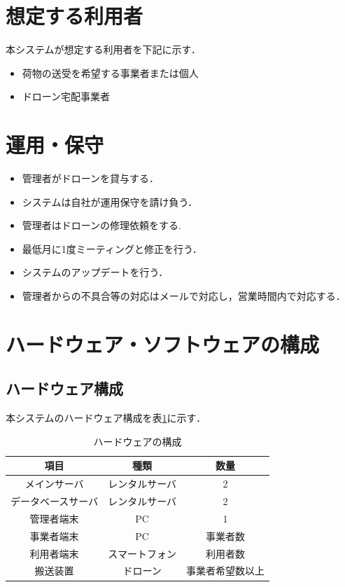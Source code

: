 \documentclass[a4paper, titlepage]{jsarticle}
\begin{document}
\section{想定する利用者}
本システムが想定する利用者を下記に示す．
\begin{itemize}
  \item 荷物の送受を希望する事業者または個人
  \item ドローン宅配事業者
\end{itemize}

\section{運用・保守}
\begin{itemize}
  \item 管理者がドローンを貸与する．
  \item システムは自社が運用保守を請け負う．
  \item 管理者はドローンの修理依頼をする.
  \item 最低月に1度ミーティングと修正を行う．
  \item システムのアップデートを行う．
  \item 管理者からの不具合等の対応はメールで対応し，営業時間内で対応する．
\end{itemize}

\section{ハードウェア・ソフトウェアの構成}
\subsection{ハードウェア構成}
本システムのハードウェア構成を表\ref{fig:hardware}に示す．
\begin{table}[H]
  \begin{center}
    \caption{ハードウェアの構成}
    \label{fig:hardware}
    \begin{tabular}{ccc} \hline
      項目        & 種類      & 数量       \\ \hline \hline
      メインサーバ    & レンタルサーバ & 2        \\
      データベースサーバ & レンタルサーバ & 2        \\
      管理者端末     & PC      & 1        \\
      事業者端末     & PC      & 事業者数     \\
      利用者端末     & スマートフォン & 利用者数     \\
      搬送装置      & ドローン    & 事業者希望数以上 \\ \hline
    \end{tabular}
  \end{center}
\end{table}
\end{document}
